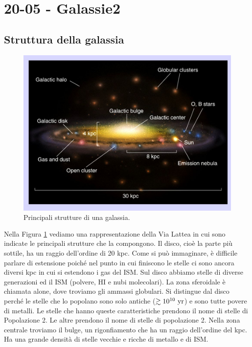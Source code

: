 \section*{20-05 - Galassie2}
\subsection*{Struttura della galassia}
\begin{figure}[h]
    \centering
    \includegraphics[width=.8\columnwidth]{images/strutturagalassia.jpg}
    \caption{Principali strutture di una galassia.}
    \label{fig:strutturagalassia}
\end{figure}
\noindent
Nella Figura \ref{fig:strutturagalassia} vediamo una rappresentazione della Via Lattea in cui sono indicate le principali strutture che la compongono. Il disco, cioè la parte più sottile, ha un raggio dell'ordine di 20 kpc. Come si può immaginare, è difficile parlare di estensione poiché nel punto in cui finiscono le stelle ci sono ancora diversi kpc in cui si estendono i gas del ISM. Sul disco abbiamo stelle di diverse generazioni ed il ISM (polvere, HI e nubi molecolari). La zona sferoidale è chiamata alone, dove troviamo gli ammassi globulari. Si distingue dal disco perché le stelle che lo popolano sono solo antiche ($\gtrsim 10^{10}\text{ yr}$) e sono tutte povere di metalli. Le stelle che hanno queste caratteristiche prendono il nome di stelle di Popolazione 2. Le altre prendono il nome di stelle di popolazione 2. Nella zona centrale troviamo il bulge, un rigonfiamento che ha un raggio dell'ordine del kpc. Ha una grande densità di stelle vecchie e ricche di metallo e di ISM.\\

